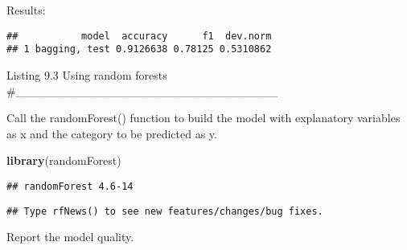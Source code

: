 \documentclass[]{article}
\newenvironment{Shaded}{\begin{snugshade}}{\end{snugshade}}
\newcommand{\DataTypeTok}[1]{\textcolor[rgb]{0.13,0.29,0.53}{#1}}
\newcommand{\DecValTok}[1]{\textcolor[rgb]{0.00,0.00,0.81}{#1}}
\newcommand{\KeywordTok}[1]{\textcolor[rgb]{0.13,0.29,0.53}{\textbf{#1}}}
\newcommand{\NormalTok}[1]{#1}
\newcommand{\OperatorTok}[1]{\textcolor[rgb]{0.81,0.36,0.00}{\textbf{#1}}}
\newcommand{\StringTok}[1]{\textcolor[rgb]{0.31,0.60,0.02}{#1}}
\begin{document}
Results:

\begin{Shaded}
\end{Shaded}

\begin{verbatim}
##           model  accuracy      f1  dev.norm
## 1 bagging, test 0.9126638 0.78125 0.5310862
\end{verbatim}

Listing 9.3 Using random forests
\#\_\_\_\_\_\_\_\_\_\_\_\_\_\_\_\_\_\_\_\_\_\_\_\_\_\_\_\_\_\_\_

Call the randomForest() function to build the model with explanatory
variables as x and the category to be predicted as y.

\begin{Shaded}
\begin{Highlighting}[]
\KeywordTok{library}\NormalTok{(randomForest)}
\end{Highlighting}
\end{Shaded}

\begin{verbatim}
## randomForest 4.6-14
\end{verbatim}

\begin{verbatim}
## Type rfNews() to see new features/changes/bug fixes.
\end{verbatim}

\begin{Shaded}
\end{Shaded}

Report the model quality.
\end{document}
